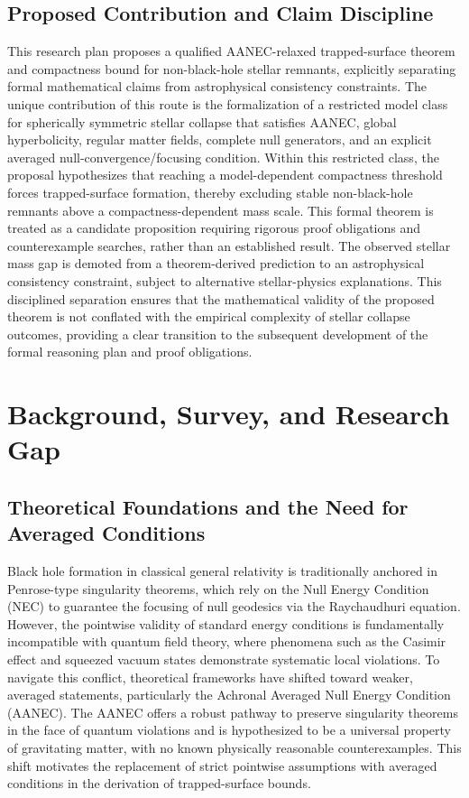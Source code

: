 \documentclass[conference]{IEEEtran}
\begin{document}
\subsection{Proposed Contribution and Claim Discipline}
This research plan proposes a qualified AANEC-relaxed trapped-surface theorem and compactness bound for non-black-hole stellar remnants, explicitly separating formal mathematical claims from astrophysical consistency constraints. The unique contribution of this route is the formalization of a restricted model class for spherically symmetric stellar collapse that satisfies AANEC, global hyperbolicity, regular matter fields, complete null generators, and an explicit averaged null-convergence/focusing condition. Within this restricted class, the proposal hypothesizes that reaching a model-dependent compactness threshold forces trapped-surface formation, thereby excluding stable non-black-hole remnants above a compactness-dependent mass scale. This formal theorem is treated as a candidate proposition requiring rigorous proof obligations and counterexample searches, rather than an established result. The observed stellar mass gap is demoted from a theorem-derived prediction to an astrophysical consistency constraint, subject to alternative stellar-physics explanations. This disciplined separation ensures that the mathematical validity of the proposed theorem is not conflated with the empirical complexity of stellar collapse outcomes, providing a clear transition to the subsequent development of the formal reasoning plan and proof obligations.

\section{Background, Survey, and Research Gap}
\subsection{Theoretical Foundations and the Need for Averaged Conditions}
Black hole formation in classical general relativity is traditionally anchored in Penrose-type singularity theorems, which rely on the Null Energy Condition (NEC) to guarantee the focusing of null geodesics via the Raychaudhuri equation. However, the pointwise validity of standard energy conditions is fundamentally incompatible with quantum field theory, where phenomena such as the Casimir effect and squeezed vacuum states demonstrate systematic local violations. To navigate this conflict, theoretical frameworks have shifted toward weaker, averaged statements, particularly the Achronal Averaged Null Energy Condition (AANEC). The AANEC offers a robust pathway to preserve singularity theorems in the face of quantum violations and is hypothesized to be a universal property of gravitating matter, with no known physically reasonable counterexamples. This shift motivates the replacement of strict pointwise assumptions with averaged conditions in the derivation of trapped-surface bounds.~\cite{cite_0ed84243cf171bc4}
\end{document}
